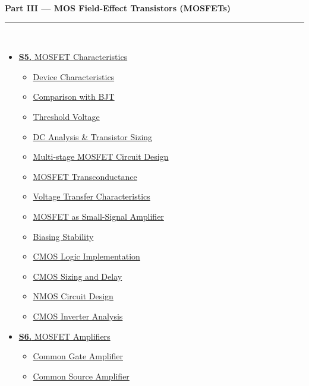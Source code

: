 \documentclass[12pt]{article}
\begin{document}
\begin{tcolorbox}[breakable,colback=cB!5,colframe=cB,boxrule=1pt,arc=5pt,
  left=8pt,right=8pt,top=8pt,bottom=8pt,before skip=4pt]
  {\large\bfseries\textcolor{cB}{Part III --- MOS Field-Effect Transistors
(MOSFETs)}}\\[5pt]
  \textcolor{cB!40}{\rule{\textwidth}{0.4pt}}\\[3pt]
  \small\begin{itemize}[leftmargin=1.2em,itemsep=1pt,label={\textcolor{cB}{$\triangleright$}}]

        \item \hyperref[sec:S5]{\textbf{S5.} MOSFET Characteristics}
      \begin{itemize}[leftmargin=1.5em,itemsep=0pt,label={\textcolor{cA}{$\cdot$}}]
        \item \hyperref[sub:s5-devchar]{Device Characteristics}
        \item \hyperref[sub:s5-compare]{Comparison with BJT}
        \item \hyperref[sub:s5-threshold]{Threshold Voltage}
        \item \hyperref[sub:s5-dc]{DC Analysis \& Transistor Sizing}
        \item \hyperref[sub:s5-multistage]{Multi-stage MOSFET Circuit Design}
        \item \hyperref[sub:s5-gm]{MOSFET Transconductance}
        \item \hyperref[sub:s5-vtc]{Voltage Transfer Characteristics}
        \item \hyperref[sub:s5-ssa]{MOSFET as Small-Signal Amplifier}
        \item \hyperref[sub:s5-biasing]{Biasing Stability}
        \item \hyperref[sub:s5-cmos]{CMOS Logic Implementation}
        \item \hyperref[sub:s5-sizing]{CMOS Sizing and Delay}
        \item \hyperref[sub:s5-nmos]{NMOS Circuit Design}
        \item \hyperref[sub:s5-cmos-inverter]{CMOS Inverter Analysis}
            
      \end{itemize}
    \item \hyperref[sec:S6]{\textbf{S6.} MOSFET Amplifiers}
      \begin{itemize}[leftmargin=1.5em,itemsep=0pt,label={\textcolor{cC}{$\cdot$}}]
        \item \hyperref[sub:s6-cg]{Common Gate Amplifier}
        \item \hyperref[sub:s6-cs]{Common Source Amplifier}
      \end{itemize}
      
      
  \end{itemize}
\end{tcolorbox}
\end{document}
